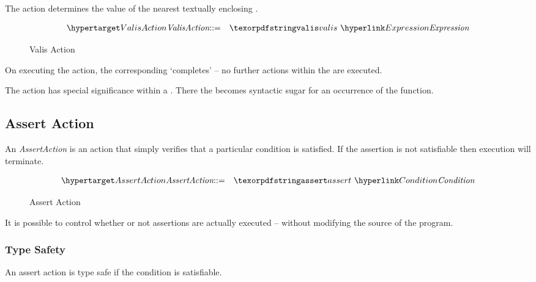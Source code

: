 The  action determines the value of the nearest textually enclosing  .

\begin{figure}[htbp]
\begin{eqnarray*}
\ntDef{ValisAction}&\arrow&\q{valis}\ \ntRef{Expression}
\end{eqnarray*}
\caption{Valis Action}
\label{valisActionFig}
\end{figure}

On executing the  action, the corresponding  `completes' -- no further actions within the  are executed.


\begin{aside}
The  action has special significance within a . There the  becomes syntactic sugar for an occurrence of the  function.
\end{aside}

\subsection{Assert Action}
\label{assert}
An \emph{AssertAction} is an action that simply verifies that a particular condition is satisfied. If the assertion is not satisfiable then execution will terminate.

\begin{figure}[htbp]
\begin{eqnarray*}
\ntDef{AssertAction}&\arrow&\q{assert}\ \ntRef{Condition}
\end{eqnarray*}
\caption{Assert Action}\label{assertActionFig}
\end{figure}

\begin{aside}
It is possible to control whether or not assertions are actually executed -- without modifying the source of the program.
\end{aside}


\subsubsection{Type Safety}
An assert action is type safe if the condition is satisfiable.

\begin{prooftree}
\end{prooftree}

